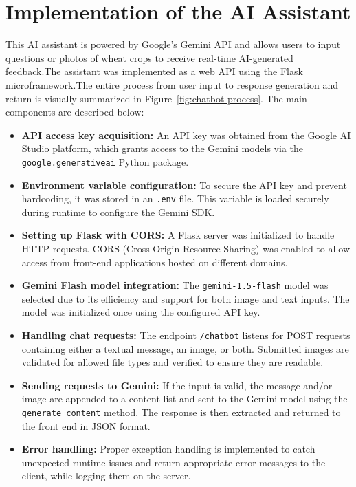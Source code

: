\section{Implementation of the AI Assistant}

This AI assistant is powered by Google's Gemini API and allows users to input questions or photos of wheat crops to receive real-time AI-generated feedback.The assistant was implemented as a web API using the Flask microframework.The entire process from user input to response generation and return is visually summarized in Figure~\ref{fig:chatbot-process}. The main components are described below:

\begin{itemize}
    \item \textbf{API access key acquisition:}  
    An API key was obtained from the Google AI Studio platform, which grants access to the Gemini models via the \texttt{google.generativeai} Python package.

    \item \textbf{Environment variable configuration:}  
    To secure the API key and prevent hardcoding, it was stored in an \texttt{.env} file. This variable is loaded securely during runtime to configure the Gemini SDK.

    \item \textbf{Setting up Flask with CORS:}  
    A Flask server was initialized to handle HTTP requests. CORS (Cross-Origin Resource Sharing) was enabled to allow access from front-end applications hosted on different domains.

    \item \textbf{Gemini Flash model integration:}  
    The \texttt{gemini-1.5-flash} model was selected due to its efficiency and support for both image and text inputs. The model was initialized once using the configured API key.

    \item \textbf{Handling chat requests:}  
    The endpoint \texttt{/chatbot} listens for POST requests containing either a textual message, an image, or both. Submitted images are validated for allowed file types and verified to ensure they are readable.

    \item \textbf{Sending requests to Gemini:}  
    If the input is valid, the message and/or image are appended to a content list and sent to the Gemini model using the \texttt{generate\_content} method. The response is then extracted and returned to the front end in JSON format.

    \item \textbf{Error handling:}  
    Proper exception handling is implemented to catch unexpected runtime issues and return appropriate error messages to the client, while logging them on the server.
\end{itemize}



